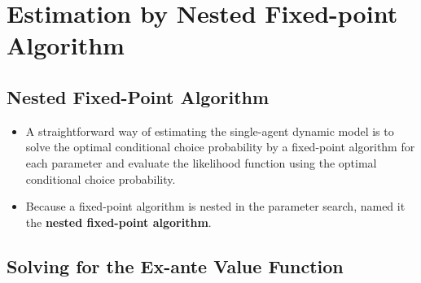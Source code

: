 \documentclass[]{book}
\providecommand{\tightlist}{%
  \setlength{\itemsep}{0pt}\setlength{\parskip}{0pt}}
\begin{document}
\section{Estimation by Nested Fixed-point
Algorithm}\label{estimation-by-nested-fixed-point-algorithm}

\subsection{Nested Fixed-Point
Algorithm}\label{nested-fixed-point-algorithm}

\begin{itemize}
\tightlist
\item
  A straightforward way of estimating the single-agent dynamic model is
  to solve the optimal conditional choice probability by a fixed-point
  algorithm for each parameter and evaluate the likelihood function
  using the optimal conditional choice probability.
\item
  Because a fixed-point algorithm is nested in the parameter search,
  \citet{rustOptimalReplacementGMC1987} named it the \textbf{nested
  fixed-point algorithm}.
\end{itemize}

\subsection{Solving for the Ex-ante Value
Function}\label{solving-for-the-ex-ante-value-function}
\end{document}
